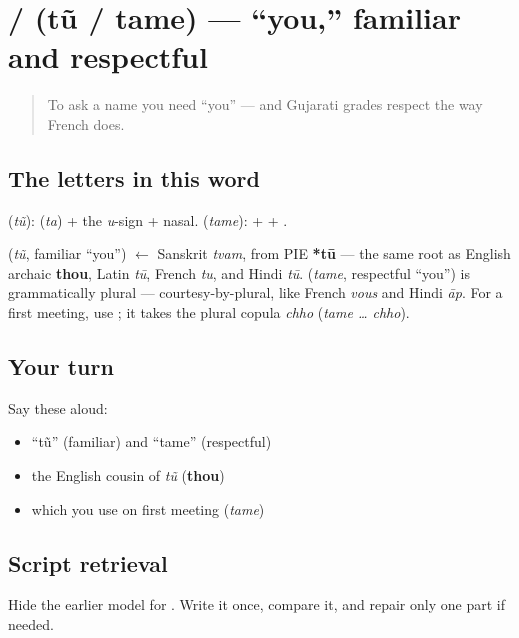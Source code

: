 \section[\gu{તું} / \gu{તમે}]{ /  (tũ / tame) — \textquotedblleft{}you,\textquotedblright{} familiar and respectful}

\label{lesson:GU-C02-tu-tame}



\begin{quote}
To ask a name you need \textquotedblleft{}you\textquotedblright{} — and Gujarati grades respect the way French does.
\end{quote}

\subsection*{The letters in this word}
\textbf{} (\emph{tũ}): \textbf{} (\emph{ta}) + the \emph{u}-sign + nasal. \textbf{} (\emph{tame}): \textbf{} + \textbf{} + \textbf{}.

\begin{cousinweb}
\textbf{} (\emph{tũ}, familiar \textquotedblleft{}you\textquotedblright{}) $\leftarrow$ Sanskrit \emph{tvam}, from PIE \textbf{*tū} — the same root as English archaic \textbf{thou}, Latin \emph{tū}, French \emph{tu}, and Hindi \emph{tū}. \textbf{} (\emph{tame}, respectful \textquotedblleft{}you\textquotedblright{}) is grammatically plural — courtesy-by-plural, like French \emph{vous} and Hindi \emph{āp}. For a first meeting, use \textbf{}; it takes the plural copula \emph{chho} (\emph{tame … chho}).
\end{cousinweb}

\subsection*{Your turn}
Say these aloud:

\begin{itemize}
\raggedright
  \item \textquotedblleft{}tũ\textquotedblright{} (familiar) and \textquotedblleft{}tame\textquotedblright{} (respectful)
  \item the English cousin of \emph{tũ} (\textbf{thou})
  \item which you use on first meeting (\emph{tame})
\end{itemize}

\subsection*{Script retrieval}
Hide the earlier model for \textbf{}. Write it once, compare it, and repair only one part if needed.

